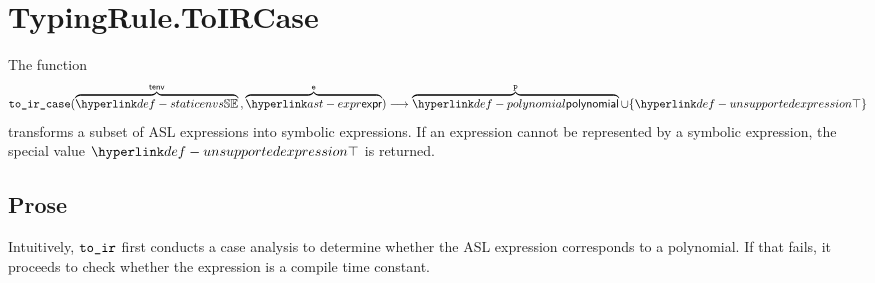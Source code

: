\section{TypingRule.ToIRCase \label{sec:TypingRule.ToIRCase}}
\hypertarget{def-toircase}{}
The function
\[
  \toircase(\overname{\staticenvs}{\tenv} \aslsep \overname{\expr}{\ve}) \aslto \overname{\polynomial}{\vp} \cup \{\CannotBeTransformed\}
\]
transforms a subset of ASL expressions into symbolic expressions. If an expression cannot be represented
by a symbolic expression, the special value $\CannotBeTransformed$ is returned.

\subsection{Prose}
Intuitively, $\texttt{to\_ir}$ first conducts a case analysis to determine whether the ASL expression corresponds to a polynomial.
If that fails, it proceeds to check whether the expression is a compile time constant.

\newcommand\ProseOrTypeErrorOrBot[0]{\ProseTerminateAs{\CannotBeTransformed,\TypeErrorConfig}}

